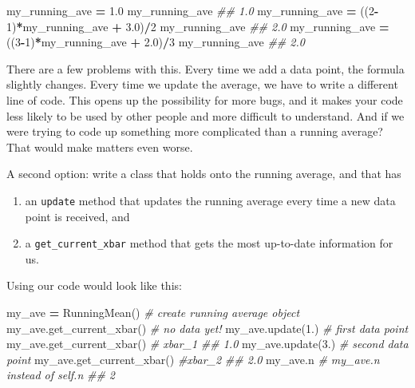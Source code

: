 \documentclass[
  12pt,
]{krantz}
\makeatletter
\newenvironment{Shaded}{\begin{snugshade}}{\end{snugshade}}
\newcommand{\CommentTok}[1]{\textcolor[rgb]{0.37,0.37,0.37}{\textit{#1}}}
\newcommand{\DecValTok}[1]{\textcolor[rgb]{0.06,0.06,0.06}{#1}}
\newcommand{\FloatTok}[1]{\textcolor[rgb]{0.06,0.06,0.06}{#1}}
\newcommand{\NormalTok}[1]{#1}
\newcommand{\OperatorTok}[1]{\textcolor[rgb]{0.43,0.43,0.43}{\textbf{#1}}}
\providecommand{\tightlist}{%
  \setlength{\itemsep}{0pt}\setlength{\parskip}{0pt}}
\newenvironment{kframe}{%
\medskip{}
\setlength{\fboxsep}{.8em}
 \def\at@end@of@kframe{}%
 \ifinner\ifhmode%
  \def\at@end@of@kframe{\end{minipage}}%
  \begin{minipage}{\columnwidth}%
 \fi\fi%
 \def\FrameCommand##1{\hskip\@totalleftmargin \hskip-\fboxsep
 \colorbox{shadecolor}{##1}\hskip-\fboxsep
     \hskip-\linewidth \hskip-\@totalleftmargin \hskip\columnwidth}%
 \MakeFramed {\advance\hsize-\width
   \@totalleftmargin\z@ \linewidth\hsize
   \@setminipage}}%
 {\par\unskip\endMakeFramed%
 \at@end@of@kframe}
\renewenvironment{Shaded}{\begin{kframe}}{\end{kframe}}
\makeatother
\begin{document}
\begin{Shaded}
\begin{Highlighting}[]
\NormalTok{my\_running\_ave }\OperatorTok{=} \FloatTok{1.0}
\NormalTok{my\_running\_ave}
\CommentTok{\#\# 1.0}
\NormalTok{my\_running\_ave }\OperatorTok{=}\NormalTok{ ((}\DecValTok{2}\OperatorTok{{-}}\DecValTok{1}\NormalTok{)}\OperatorTok{*}\NormalTok{my\_running\_ave }\OperatorTok{+} \FloatTok{3.0}\NormalTok{)}\OperatorTok{/}\DecValTok{2}
\NormalTok{my\_running\_ave}
\CommentTok{\#\# 2.0}
\NormalTok{my\_running\_ave }\OperatorTok{=}\NormalTok{ ((}\DecValTok{3}\OperatorTok{{-}}\DecValTok{1}\NormalTok{)}\OperatorTok{*}\NormalTok{my\_running\_ave }\OperatorTok{+} \FloatTok{2.0}\NormalTok{)}\OperatorTok{/}\DecValTok{3}
\NormalTok{my\_running\_ave}
\CommentTok{\#\# 2.0}
\end{Highlighting}
\end{Shaded}

There are a few problems with this. Every time we add a data point, the formula slightly changes. Every time we update the average, we have to write a different line of code. This opens up the possibility for more bugs, and it makes your code less likely to be used by other people and more difficult to understand. And if we were trying to code up something more complicated than a running average? That would make matters even worse.

A second option: write a class that holds onto the running average, and that has

\begin{enumerate}
\def\labelenumi{\arabic{enumi}.}
\tightlist
\item
  an \texttt{update} method that updates the running average every time a new data point is received, and
\item
  a \texttt{get\_current\_xbar} method that gets the most up-to-date information for us.
\end{enumerate}

Using our code would look like this:

\begin{Shaded}
\begin{Highlighting}[]
\NormalTok{my\_ave }\OperatorTok{=}\NormalTok{ RunningMean() }\CommentTok{\# create running average object}
\NormalTok{my\_ave.get\_current\_xbar() }\CommentTok{\# no data yet!}
\NormalTok{my\_ave.update(}\FloatTok{1.}\NormalTok{) }\CommentTok{\# first data point}
\NormalTok{my\_ave.get\_current\_xbar() }\CommentTok{\# xbar\_1}
\CommentTok{\#\# 1.0}
\NormalTok{my\_ave.update(}\FloatTok{3.}\NormalTok{)  }\CommentTok{\# second data point}
\NormalTok{my\_ave.get\_current\_xbar()  }\CommentTok{\#xbar\_2}
\CommentTok{\#\# 2.0}
\NormalTok{my\_ave.n   }\CommentTok{\# my\_ave.n instead of self.n}
\CommentTok{\#\# 2}
\end{Highlighting}
\end{Shaded}
\end{document}
